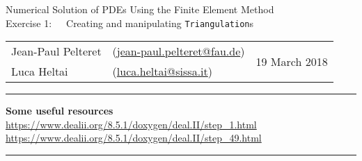 \documentclass[11pt]{exam}
\makeatletter
\newcommand{\makeheader}[3]{%
\setcounter{question}{0}
\begin{center}
{\sc Numerical Solution of PDEs Using the Finite Element Method}\vspace{2ex}\\
{\sc Exercise #1:\ \ \ #2}\vspace{2ex}\\
\begin{tabular*}{\textwidth}{ll @{\extracolsep{\fill}}r}
Jean-Paul Pelteret & (\url{jean-paul.pelteret@fau.de}) & \multirow{2}{*}{#3} \\
Luca Heltai & (\url{luca.heltai@sissa.it}) & \\
\end{tabular*}
\end{center}
}
\newcommand{\makeresources}[1]{%
\rule{\textwidth}{0.6mm}
\textbf{Some useful resources}\\[1.5ex]
#1 \par
\rule{\textwidth}{0.6mm}
}
\makeatother
\begin{document}
%
%




\clearpage
\makeheader{1}{Creating and manipulating \texttt{Triangulation}s}{19 March 2018}
\makeresources{%
\url{https://www.dealii.org/8.5.1/doxygen/deal.II/step_1.html} \\
\url{https://www.dealii.org/8.5.1/doxygen/deal.II/step_49.html}
}
\end{document}
